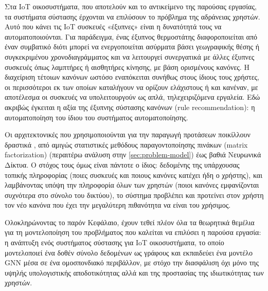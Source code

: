 Στα IoT οικοσυστήματα, που αποτελούν και το αντικείμενο της παρούσας εργασίας, τα συστήματα σύστασης έρχονται να επιλύσουν το πρόβλημα της αδράνειας χρηστών. Αυτό που κάνει τις IoT συσκευές «έξυπνες» είναι η δυνατότητά τους να αυτοματοποιούνται. Για παράδειγμα, ένας έξυπνος θερμοστάτης διαφοροποιείται από έναν συμβατικό διότι μπορεί να ενεργοποιείται ασύρματα βάσει γεωγραφικής θέσης ή συγκεκριμένου χρονοδιαγράμματος και να λειτουργεί συνεργατικά με άλλες έξυπνες συσκευές όπως λαμπτήρες ή αισθητήρες κίνησης, με βάση ορισμένους κανόνες. Η διαχείριση τέτοιων κανόνων ωστόσο εναπόκειται συνήθως στους ίδιους τους χρήστες, οι περισσότεροι εκ των οποίων καταλήγουν να ορίζουν ελάχιστους ή και κανέναν, με αποτέλεσμα οι συσκευές να υπολειτουργούν ως απλά, τηλεχειριζόμενα εργαλεία. Εδώ ακριβώς έγκειται η αξία της έξυπνης σύστασης κανόνων (rule recommendation): η αυτοματοποίηση του ίδιου του συστήματος αυτοματοποίησης.

Οι αρχιτεκτονικές που χρησιμοποιούνται για την παραγωγή προτάσεων ποικίλλουν δραστικά \cite{adomavicius_toward_2005}, από αμιγώς στατιστικές μεθόδους παραγοντοποίησης πινάκων (matrix factorization) (περαιτέρω ανάλυση στην \autoref{sec:problem-model}) έως βαθιά Νευρωνικά Δίκτυα. Ο στόχος τους όμως είναι πάντοτε ο ίδιος: δεδομένης της υπάρχουσας τοπικής πληροφορίας (ποιες συσκευές και ποιους κανόνες κατέχει ήδη ο χρήστης), και λαμβάνοντας υπόψη την πληροφορία όλων των χρηστών (ποιοι κανόνες εμφανίζονται συχνότερα στο σύνολο του δικτύου), το σύστημα προβλέπει και προτείνει στον χρήστη τον νέο κανόνα που έχει την μεγαλύτερη πιθανότητα να είναι του χρήσιμος.

Ολοκληρώνοντας το παρόν Κεφάλαιο, έχουν τεθεί πλέον όλα τα θεωρητικά θεμέλια για τη μοντελοποίηση του προβλήματος που καλείται να επιλύσει η παρούσα εργασία: η ανάπτυξη ενός συστήματος σύστασης για IoT οικοσυστήματα, το οποίο μοντελοποιεί ένα δοθέν σύνολο δεδομένων ως γράφους και εκπαιδεύει ένα μοντέλο GNN μέσα σε ένα ομοσπονδιακό περιβάλλον, με στόχο την διασφάλιση όχι μόνο της υψηλής υπολογιστικής αποδοτικότητας αλλά και της προστασίας της ιδιωτικότητας των χρηστών.
